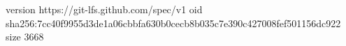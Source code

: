 version https://git-lfs.github.com/spec/v1
oid sha256:7cc40f9955d3de1a06cbbfa630b0cecb8b035c7e390c427008fef501156dc922
size 3668
